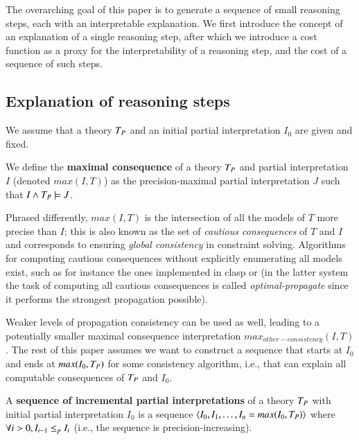 
The overarching goal of this paper is to generate a sequence of small reasoning steps, each with an interpretable explanation. 
We first introduce the concept of an explanation of a single reasoning step, after which we introduce a cost function as a proxy for the interpretability of a reasoning step, and the cost of a sequence of such steps. 

\subsection{Explanation of reasoning steps}
We assume that a theory $T_P$ and an initial partial interpretation $I_0$ are given and fixed. 

\begin{definition}
We define the \textbf{maximal consequence} of a theory $T_P$ and partial interpretation $I$ (denoted $max(I,T)$) as the precision-maximal partial interpretation $J$ such that  $I \wedge T_P \models J$. 
\end{definition}

Phrased differently, $max(I,T)$ is the intersection of all the models of $T$ more precise than $I$; this is also known as the set of \emph{cautious consequences} of $T$ and $I$ and corresponds to ensuring \emph{global consistency} in constraint solving.
Algorithms for computing cautious consequences without explicitly enumerating all models exist, such as for instance the ones implemented in clasp \cite{DBLP:conf/lpnmr/GebserKS09} or \idp \cite{IDP} (in the latter system the task of computing all cautious consequences is called \emph{optimal-propagate} since it performs the strongest propagation possible).

Weaker levels of propagation consistency can be used as well, leading to a potentially smaller maximal consequence interpretation $max_{other-consistency}(I,T)$. 
The rest of this paper assumes we want to construct a sequence that starts at $I_0$ and ends at $max(I_0,T_P)$ for some consistency algorithm, i.e., that can explain all computable consequences of $T_P$ and $I_0$. 
\begin{definition}
A \textbf{sequence of incremental partial interpretations} of a theory $T_P$ with initial partial interpretation $I_0$ is a sequence $\langle I_0, I_1, \ldots, I_n  = max(I_0,T_P)\rangle$ where $\forall i>0, I_{i-1} \leq_p I_{i}$ (i.e., the sequence is precision-increasing).
\end{definition} 

